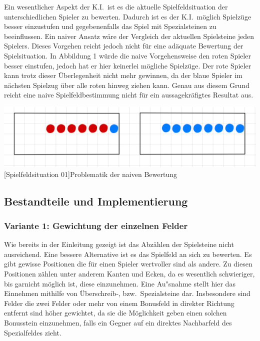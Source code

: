 Ein wesentlicher Aspekt der K.I.\ ist es die aktuelle Spielfeldsituation der unterschiedlichen Spieler zu bewerten.
Dadurch ist es der K.I.\ m\"oglich Spielz\"uge besser einzustufen und gegebenenfalls das Spiel mit Spezialsteinen zu beeinflussen.
Ein naiver Ansatz w\"are der Vergleich der aktuellen Spielsteine jeden Spielers.
Dieses Vorgehen reicht jedoch nicht f\"ur eine ad\"aquate Bewertung der Spielsituation.
In Abbildung 1 w\"urde die naive Vorgehensweise den roten Spieler besser einstufen, jedoch hat er hier keinerlei m\"ogliche Spielz\"uge.
Der rote Spieler kann trotz dieser \"Uberlegenheit nicht mehr gewinnen, da der blaue Spieler im n\"achsten Spielzug \"uber alle roten hinweg ziehen kann.
Genau aus diesem Grund reicht eine naive Spielfeldbestimmung nicht f\"ur ein aussagekr\"afigtes Resultat aus.

\vspace{1em}
\begin{minipage}{\linewidth}
    \centering
    \includegraphics[width=0.6\linewidth]{pics/naive-spielsituation}
    [Spielfeldsituation 01]{Problematik der naiven Bewertung}
    \label{fig:naivespielfeld01}
\end{minipage}

\subsection{Bestandteile und Implementierung}\label{subsec:bestandteile-und-implementierung}

\subsubsection{Variante 1: Gewichtung der einzelnen Felder}
Wie bereits in der Einleitung gezeigt ist das Abz\"ahlen der Spielsteine nicht ausreichend.
Eine bessere Alternative ist es das Spielfeld an sich zu bewerten.
Es gibt gewisse Positionen die f\"ur einen Spieler wertvoller sind als andere.
Zu diesen Positionen z\"ahlen unter anderem Kanten und Ecken, da es wesentlich schwieriger, bis garnicht m\"oglich ist, diese einzunehmen.
Eine Au"snahme stellt hier das Einnehmen mithilfe von \"Uberschreib-, bzw.\ Spezialsteine dar.
Insbesondere sind Felder die zwei Felder oder mehr von einem Bonusfeld in direkter Richtung entfernt sind h\"oher gewichtet, da sie die M\"oglichkeit geben einen solchen Bonusstein einzunehmen, falls ein Gegner auf ein direktes Nachbarfeld des Spezialfeldes zieht.

